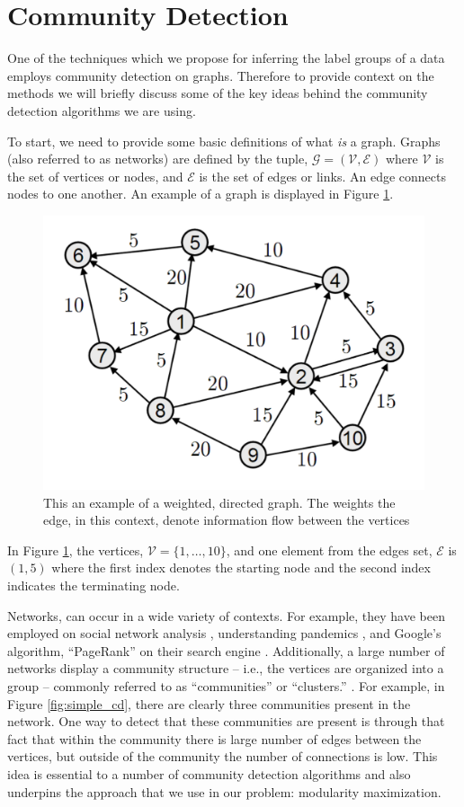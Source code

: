 \documentclass[../thesis.tex]{subfiles}
\begin{document}
\section{Community Detection}
One of the techniques which we propose for inferring the label groups of a data employs community detection on graphs. Therefore to provide context on the methods we will briefly discuss some of the key ideas behind the community detection algorithms we are using.

To start, we need to provide some basic definitions of what \textit{is} a graph. Graphs (also referred to as networks) are defined by the tuple, $\mathcal{G} = (\mathcal{V}, \mathcal{E})$ where $\mathcal{V}$ is the set of vertices or nodes, and $\mathcal{E}$ is the set of edges or links. An edge connects nodes to one another. An example of a graph is displayed in Figure \ref{fig:simple_graph}.

\begin{figure}
    \centering
    \includegraphics[width=.7\linewidth]{images/simple_graph.pdf}
    \caption[Example Graph]{This an example of a weighted, directed graph. The weights the edge, in this context, denote information flow between the vertices}
    \label{fig:simple_graph}
\end{figure}
In Figure \ref{fig:simple_graph}, the vertices, $\mathcal{V} = \{1, \ldots, 10\}$, and one element from the edges set, $\mathcal{E}$ is $(1, 5)$ where the first index denotes the starting node and the second index indicates the terminating node. 

Networks, can occur in a wide variety of contexts. For example, they have been employed on social network analysis \cite{wasserman1994social}, understanding pandemics \cite{gomez2017network}, and Google's algorithm, ``PageRank'' on their search engine \cite{page1999pagerank}. Additionally, a large number of networks display a community structure -- i.e., the vertices are organized into a group -- commonly referred to as ``communities'' or ``clusters.'' \cite{fortunato2016community}. For example, in Figure \ref{fig:simple_cd}, there are clearly three communities present in the network. One way to detect that these communities are present is through that fact that within the community there is large number of edges between the vertices, but outside of the community the number of connections is low. This idea is essential to a number of community detection algorithms and also underpins the approach that we use in our problem: modularity maximization.
\end{document}
